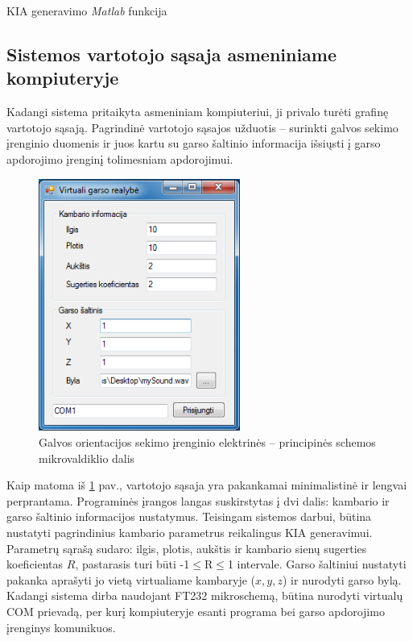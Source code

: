 \documentclass[]{vgtuef}
\begin{document}
{\begin{cfigure}
  \centering
  \caption{KIA generavimo \textit{Matlab} funkcija}
  \label{code:RIA_gen}
  
\end{cfigure}

\newpage

\subsection{Sistemos vartotojo sąsaja asmeniniame kompiuteryje}

Kadangi sistema pritaikyta asmeniniam kompiuteriui, ji privalo turėti grafinę vartotojo sąsają. Pagrindinė vartotojo sąsajos užduotis -- surinkti galvos sekimo įrenginio duomenis ir juos kartu su garso šaltinio informacija išsiųsti į garso apdorojimo įrenginį tolimesniam apdorojimui.

\begin{figure}[htbp]
  \centering
  \includegraphics[width=250px]{img/GUI.png}
  \caption{Galvos orientacijos sekimo įrenginio elektrinės – principinės schemos mikrovaldiklio dalis}
  \label{fig:GUI}
\end{figure}

Kaip matoma iš \ref{fig:GUI} pav., vartotojo sąsaja yra pakankamai minimalistinė ir lengvai perprantama. Programinės įrangos langas suskirstytas į dvi dalis: kambario ir garso šaltinio informacijos nustatymus.
Teisingam sistemos darbui, būtina nustatyti pagrindinius kambario parametrus reikalingus KIA generavimui. Parametrų sąrašą sudaro: ilgis, plotis, aukštis ir kambario sienų sugerties koeficientas $R$, pastarasis turi būti -1$\leq$R$\leq$1 intervale.
Garso šaltiniui nustatyti pakanka aprašyti jo vietą virtualiame kambaryje ($x, y, z$) ir nurodyti garso bylą.
Kadangi sistema dirba naudojant FT232 mikroschemą, būtina nurodyti virtualų COM prievadą, per kurį kompiuteryje esanti programa bei garso apdorojimo įrenginys komunikuos. 

}
\end{document}
